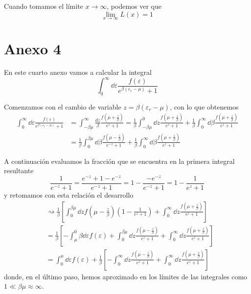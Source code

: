 Cuando tomamos el límite $x \rightarrow \infty$, podemos ver que
\begin{equation}
	\lim_{x\rightarrow \infty} L(x) = 1
\end{equation}

\newpage
\clearpage
\section*{Anexo 4}\label{Anx4}
\renewcommand{\theequation}{A\textsubscript{4}.\arabic{equation}}
\setcounter{equation}{0}

En este cuarto anexo vamos a calcular la integral
\begin{equation}
	\int_{0}^{\infty} \dd{\varepsilon} \frac{f(\varepsilon)}{e^{\beta(\varepsilon_r - \mu)} + 1}
\end{equation}

Comenzamos con el cambio de variable $z = \beta(\varepsilon_r - \mu)$, con lo que obtenemos
\begin{align}\label{eq:des1}
	\int_{0}^{\infty} \dd{\varepsilon} \frac{f(\varepsilon)}{e^{\beta(\varepsilon_r - \mu)} + 1} &= \int_{-\beta\mu}^{\infty} \frac{dz}{\beta} \frac{f(\mu + \frac{z}{\beta})}{e^z + 1} = \frac{1}{\beta} \int_{-\beta\mu}^{0} \dd{z} \frac{f(\mu + \frac{z}{\beta})}{e^z + 1} + \frac{1}{\beta} \int_{0}^{\infty} \dd{\beta} \frac{f(\mu + \frac{z}{\beta})}{e^z + 1} \nonumber\\
	&= \frac{1}{\beta} \int_{0}^{\beta\mu} \dd{\beta} \frac{f(\mu - \frac{z}{\beta})}{e^{-z} + 1} + \frac{1}{\beta} \int_{0}^{\infty} \dd{\beta} \frac{f(\mu + \frac{z}{\beta})}{e^z + 1}
\end{align}

A continuación evaluamos la fracción que se encuentra en la primera integral resultante
\begin{equation}
	\frac{1}{e^{-z} + 1} = \frac{e^{-z} + 1 - e^{-z}}{e^{-z} + 1} = 1 - \frac{-e^{-z}}{e^{-z} + 1} = 1 - \frac{1}{e^{z} + 1}
\end{equation}
y retomamos con esta relación el desarrollo
\begin{align}\label{eq:des2}
	&\rightsquigarrow \frac{1}{\beta} \left[  \int_{0}^{\beta\mu} \dd{z} f\left( \mu - \frac{z}{\beta}\right) \left( 1 - \frac{1}{e^{z} + 1} \right) + \int_{0}^{\infty} \dd{z} \frac{f(\mu + \frac{z}{\beta})}{e^z + 1}\right] \nonumber \\
	&= \frac{1}{\beta} \left[ - \int_{\mu}^{0} \beta \dd{\varepsilon} f(\varepsilon) +  \int_{0}^{\beta\mu} \dd{z} \frac{f\left( \mu - \frac{z}{\beta}\right)}{e^{z} + 1} + \int_{0}^{\infty} \dd{z} \frac{f(\mu + \frac{z}{\beta})}{e^z + 1}\right]\\
	&= \int_{0}^{\mu} \dd{\varepsilon} f(\varepsilon) + \frac{1}{\beta} \left[ -\int_{0}^{\infty} \dd{z} \frac{f\left( \mu - \frac{z}{\beta}\right)}{e^z + 1} + \int_{0}^{\infty} \dd{z} \frac{f\left( \mu + \frac{z}{\beta}\right)}{e^z + 1} \right] \nonumber
\end{align}
donde, en el último paso, hemos aproximado en los límites de las integrales como $1 \ll \beta\mu \approx \infty$.


